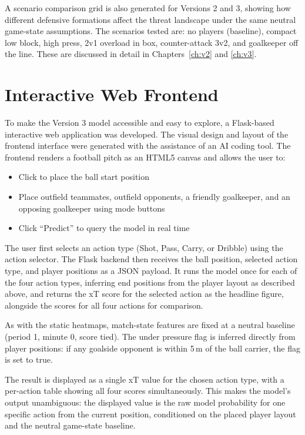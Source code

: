 A scenario comparison grid is also generated for Versions 2 and 3, showing how different defensive formations affect the threat landscape under the same neutral game-state assumptions. The scenarios tested are: no players (baseline), compact low block, high press, 2v1 overload in box, counter-attack 3v2, and goalkeeper off the line. These are discussed in detail in Chapters~\ref{ch:v2} and \ref{ch:v3}.

\section{Interactive Web Frontend}

To make the Version 3 model accessible and easy to explore, a Flask-based interactive web application was developed. The visual design and layout of the frontend interface were generated with the assistance of an AI coding tool. The frontend renders a football pitch as an HTML5 canvas and allows the user to:

\begin{itemize}
    \item Click to place the ball start position
    \item Place outfield teammates, outfield opponents, a friendly goalkeeper, and an opposing goalkeeper using mode buttons
    \item Click ``Predict'' to query the model in real time
\end{itemize}

The user first selects an action type (Shot, Pass, Carry, or Dribble) using the action selector. The Flask backend then receives the ball position, selected action type, and player positions as a JSON payload. It runs the model once for each of the four action types, inferring end positions from the player layout as described above, and returns the xT score for the selected action as the headline figure, alongside the scores for all four actions for comparison.

 As with the static heatmaps, match-state features are fixed at a neutral baseline (period 1, minute 0, score tied). The under pressure flag is inferred directly from player positions: if any goalside opponent is within 5\,m of the ball carrier, the flag is set to true.

The result is displayed as a single xT value for the chosen action type, with a per-action table showing all four scores simultaneously. This makes the model's output unambiguous: the displayed value is the raw model probability for one specific action from the current position, conditioned on the placed player layout and the neutral game-state baseline.

